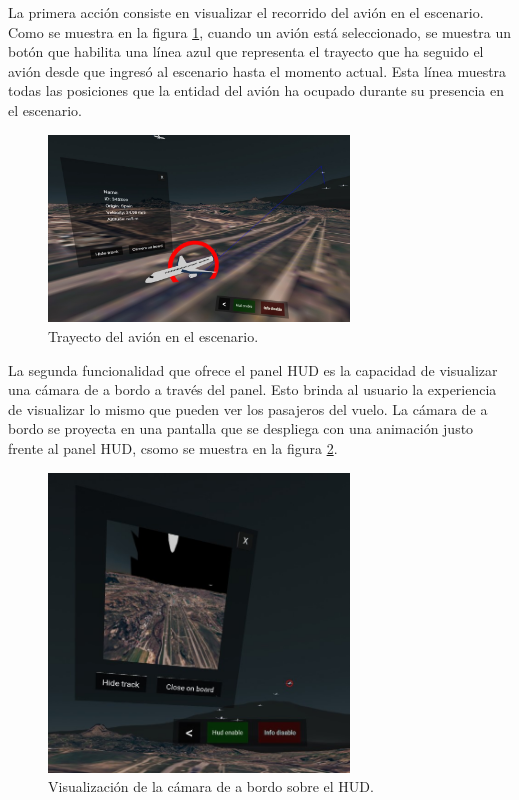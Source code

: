 \documentclass[a4paper, 11pt]{book}
\begin{document}
La primera acción consiste en visualizar el recorrido del avión en el escenario. Como se muestra en la figura \ref{fig:showTrack}, cuando un avión está seleccionado, se muestra un botón que habilita una línea azul que representa el trayecto que ha seguido el avión desde que ingresó al escenario hasta el momento actual. Esta línea muestra todas las posiciones que la entidad del avión ha ocupado durante su presencia en el escenario.
\begin{figure}[H]
  \centering
  \includegraphics[width=8cm, keepaspectratio]{img/show_track.jpg}
  \caption{Trayecto del avión en el escenario.}
  \label{fig:showTrack}
\end{figure}
La segunda funcionalidad que ofrece el panel HUD es la capacidad de visualizar una cámara de a bordo a través del panel. Esto brinda al usuario la experiencia de visualizar lo mismo que pueden ver los pasajeros del vuelo. La cámara de a bordo se proyecta en una pantalla que se despliega con una animación justo frente al panel HUD, csomo se muestra en la figura \ref{fig:cameraOnBoard}.
\begin{figure}[H]
  \centering
  \includegraphics[width=8cm, keepaspectratio]{img/cameraOnBoard.jpg}
  \caption{Visualización de la cámara de a bordo sobre el HUD.}
  \label{fig:cameraOnBoard}
\end{figure}
\end{document}
